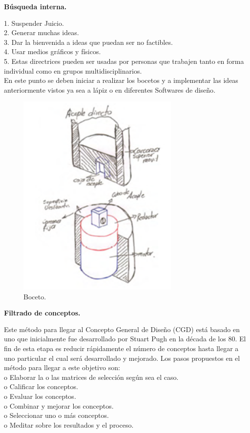 \documentclass{article}
\begin{document}
\textbf{Búsqueda interna.} 


1. Suspender Juicio.
\\2. Generar muchas ideas.
\\3. Dar la bienvenida a ideas que puedan ser no factibles.
\\4. Usar medios gráficos y físicos.
\\5. Estas directrices pueden ser usadas por personas que trabajen tanto en forma
individual como en grupos multidisciplinarios.
\\En este punto se deben iniciar a realizar los bocetos y a implementar las ideas anteriormente vistos ya sea a lápiz o en diferentes Softwares de diseño\cite{ff5}.

\begin{figure}[H] %
    \centering
    \includegraphics[width=80mm]{boceto.png} %
    \caption{Boceto\cite{ff5}.}
    \label{grafica:once}
\end{figure}

\textbf{Filtrado de conceptos.} 


Este método para llegar al Concepto General de Diseño (CGD) está basado en uno que inicialmente fue desarrollado por Stuart Pugh en la década de los 80. El fin de esta etapa es reducir rápidamente el número de conceptos hasta llegar a uno particular el cual será desarrollado y mejorado. Los pasos propuestos en el método para llegar a este objetivo son:
\\o	Elaborar la o las matrices de selección según sea el caso.
\\o	Calificar los conceptos.
\\o	Evaluar los conceptos.
\\o	Combinar y mejorar los conceptos.
\\o	Seleccionar uno o más conceptos.
\\o	Meditar sobre los resultados y el proceso\cite{ff5}.
\end{document}
